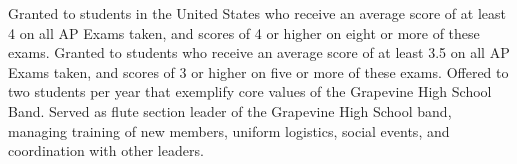 \documentclass[
    10pt,
    A4,
    english,
    draft = false,
    twoside = false,
]{article}
\begin{document}
	\newpage
	
        {Granted to students in the United States who receive an average score
        of at least 4 on all AP Exams taken, and scores of 4 or higher on eight
        or more of these exams.}
        {Granted to students who receive an average score of at least 3.5 on
        all AP Exams taken, and scores of 3 or higher on five or more of these
        exams.}
        {Offered to two students per year that exemplify core values of the
        Grapevine High School Band.}
        {Served as flute section leader of the Grapevine High School band,
        managing training of new members, uniform logistics, social events, and
        coordination with other leaders.}
\end{document}
